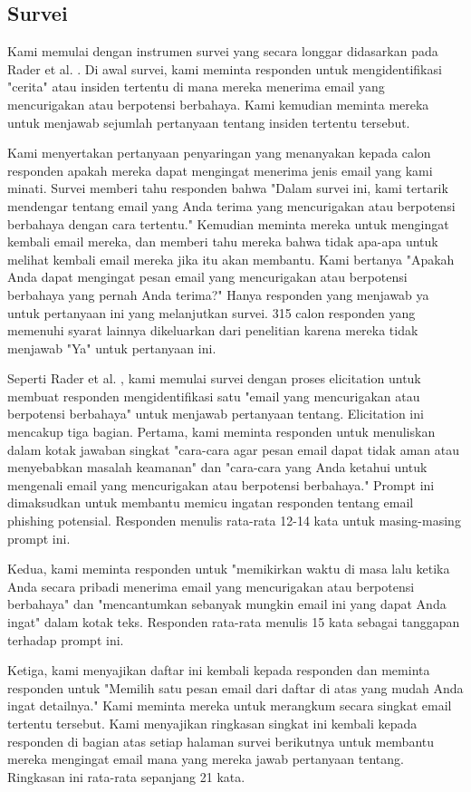 \documentclass[lettersize,journal]{IEEEtran}
\begin{document}
\subsection{Survei}
Kami memulai dengan instrumen survei yang secara longgar didasarkan pada Rader
et al. \cite{duatujuh}. Di awal survei, kami meminta responden untuk
mengidentifikasi "cerita" atau insiden tertentu di mana mereka menerima email
yang mencurigakan atau berpotensi berbahaya. Kami kemudian meminta mereka untuk
menjawab sejumlah pertanyaan tentang insiden tertentu tersebut.

Kami menyertakan pertanyaan penyaringan yang menanyakan kepada calon responden
apakah mereka dapat mengingat menerima jenis email yang kami minati. Survei
memberi tahu responden bahwa "Dalam survei ini, kami tertarik mendengar tentang
email yang Anda terima yang mencurigakan atau berpotensi berbahaya dengan cara
tertentu." Kemudian meminta mereka untuk mengingat kembali email mereka, dan
memberi tahu mereka bahwa tidak apa-apa untuk melihat kembali email mereka jika
itu akan membantu. Kami bertanya "Apakah Anda dapat mengingat pesan email yang
mencurigakan atau berpotensi berbahaya yang pernah Anda terima?" Hanya
responden yang menjawab ya untuk pertanyaan ini yang melanjutkan survei. 315
calon responden yang memenuhi syarat lainnya dikeluarkan dari penelitian karena
mereka tidak menjawab "Ya" untuk pertanyaan ini.

Seperti Rader et al. \cite{duatujuh}, kami memulai survei dengan proses
elicitation untuk membuat responden mengidentifikasi satu "email yang
mencurigakan atau berpotensi berbahaya" untuk menjawab pertanyaan tentang.
Elicitation ini mencakup tiga bagian. Pertama, kami meminta responden untuk
menuliskan dalam kotak jawaban singkat "cara-cara agar pesan email dapat tidak
aman atau menyebabkan masalah keamanan" dan "cara-cara yang Anda ketahui untuk
mengenali email yang mencurigakan atau berpotensi berbahaya." Prompt ini
dimaksudkan untuk membantu memicu ingatan responden tentang email phishing
potensial. Responden menulis rata-rata 12-14 kata untuk masing-masing prompt
ini.

Kedua, kami meminta responden untuk "memikirkan waktu di masa lalu ketika Anda
secara pribadi menerima email yang mencurigakan atau berpotensi berbahaya" dan
"mencantumkan sebanyak mungkin email ini yang dapat Anda ingat" dalam kotak
teks. Responden rata-rata menulis 15 kata sebagai tanggapan terhadap prompt
ini.

Ketiga, kami menyajikan daftar ini kembali kepada responden dan meminta
responden untuk "Memilih satu pesan email dari daftar di atas yang mudah Anda
ingat detailnya." Kami meminta mereka untuk merangkum secara singkat email
tertentu tersebut. Kami menyajikan ringkasan singkat ini kembali kepada
responden di bagian atas setiap halaman survei berikutnya untuk membantu mereka
mengingat email mana yang mereka jawab pertanyaan tentang. Ringkasan ini
rata-rata sepanjang 21 kata.
\end{document}
